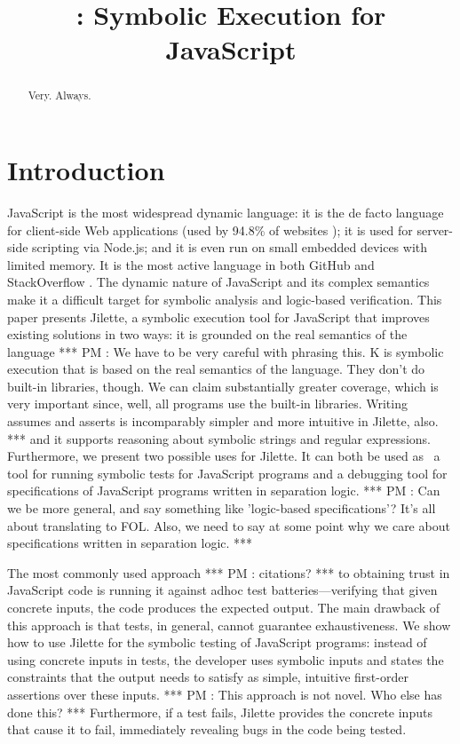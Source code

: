 \documentclass{llncs}
\title{\jilette: Symbolic Execution for JavaScript}
\author{}
\institute{}
\newcommand{\jilette}{Jilette\xspace}
\newcommand{\myparagraph}[1]{\smallskip\noindent {\bf #1.}\hspace{1pt}}
\newcommand{\pmaxinline}[1]{ {\color{blue} *** PM : #1 ***} }
\begin{document}
%

\maketitle 

\begin{abstract}
Very. Always.
\end{abstract}


\section{Introduction}

JavaScript is the most widespread dynamic language: it is the de facto language for client-side Web applications (used by 94.8\% of websites \cite{JS948percent});
it is used for server-side scripting via Node.js; and it is even run on small embedded devices with limited 
memory. It is the most active language in both GitHub \cite{GithubActive} and StackOverflow \cite{SOActive}.
The dynamic nature of JavaScript and its complex semantics make it a difficult target for
symbolic analysis and logic-based verification. 
This paper presents \jilette, a symbolic execution tool for JavaScript that improves existing solutions
in two ways:  it is grounded on the real semantics of the language \pmaxinline{We have to be very careful with phrasing this. K is symbolic execution that is based on the real semantics of the language. They don't do built-in libraries, though. We can claim substantially greater coverage, which is very important since, well, all programs use the built-in libraries. Writing assumes and asserts is incomparably simpler and more intuitive in Jilette, also.} and 
 it supports reasoning about symbolic strings and regular expressions.
%
Furthermore, we present two possible uses for \jilette. It can both be used as ~a tool for
 running symbolic tests for JavaScript programs and  a debugging tool for specifications of JavaScript programs written in separation logic. \pmaxinline{Can we be more general, and say something like 'logic-based specifications'? It's all about translating to FOL. Also, we need to say at some point why we care about specifications written in separation logic.} 

\myparagraph{Symbolic Testing} The most commonly used 
approach \pmaxinline{citations?} to obtaining trust in JavaScript code is running it against 
adhoc test batteries---verifying that given concrete inputs, the code produces the expected
output. The main drawback of this approach is that tests, in general,
cannot guarantee exhaustiveness. We show how to use \jilette
for the symbolic testing of JavaScript programs: instead of using concrete 
inputs in tests, the developer uses symbolic inputs and states the 
constraints that the output needs to satisfy as simple, intuitive 
first-order assertions over these inputs. \pmaxinline{This approach is 
not novel. Who else has done this?}
Furthermore, if a test fails, Jilette provides the concrete inputs that cause it 
to fail, immediately revealing bugs in the code being tested.
\end{document}
